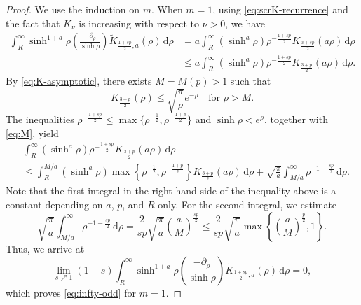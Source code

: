 \documentclass[11pt]{amsart}
\theoremstyle{plain}
\theoremstyle{definition}
\numberwithin{equation}{section}
\begin{document}
\begin{proof}
We use the induction on $m$. When $m=1$, using \eqref{eq:scrK-recurrence} and the fact that $K_{\nu}$ is increasing with respect to $\nu > 0$, we have
\begin{equation*}
\begin{split}
\int_{R}^{\infty} \sinh^{1+a}\rho \left( \frac{-\partial_{\rho}}{\sinh \rho} \right) \widetilde{K}_{\frac{1+sp}{2},a}(\rho)\, \mathrm{d}\rho
&= a \int_{R}^{\infty} (\sinh^{a} \rho) \rho^{-\frac{1+sp}{2}} K_{\frac{3+sp}{2}}(a\rho) \, \mathrm{d}\rho \\
&\leq a \int_{R}^{\infty} (\sinh^{a} \rho) \rho^{-\frac{1+sp}{2}} K_{\frac{3+p}{2}}(a\rho) \, \mathrm{d}\rho.
\end{split}
\end{equation*}
By \eqref{eq:K-asymptotic}, there exists $M = M(p) > 1$ such that
\begin{equation} \label{eq:M}
K_{\frac{3+p}{2}}(\rho) \leq \sqrt{\frac{\pi}{\rho}} e^{-\rho}\quad\text{for } \rho > M.
\end{equation}
The inequalities $\rho^{-\frac{1+sp}{2}} \leq \max\lbrace \rho^{-\frac{1}{2}}, \rho^{-\frac{1+p}{2}} \rbrace$ and $\sinh \rho < e^{\rho}$, together with \eqref{eq:M}, yield
\begin{equation*}
\begin{split}
&\int_{R}^{\infty} (\sinh^{a} \rho) \rho^{-\frac{1+sp}{2}} K_{\frac{3+p}{2}}(a\rho) \, \mathrm{d}\rho \\
&\leq \int_{R}^{M/a} (\sinh^{a} \rho) \max\left\lbrace \rho^{-\frac{1}{2}}, \rho^{-\frac{1+p}{2}} \right\rbrace K_{\frac{3+p}{2}}(a\rho) \, \mathrm{d}\rho + \sqrt{\frac{\pi}{a}} \int_{M/a}^{\infty} \rho^{-1-\frac{sp}{2}} \, \mathrm{d}\rho.
\end{split}
\end{equation*}
Note that the first integral in the right-hand side of the inequality above is a constant depending on $a$, $p$, and $R$ only. For the second integral, we estimate
\begin{equation*}
\sqrt{\frac{\pi}{a}} \int_{M/a}^{\infty} \rho^{-1-\frac{sp}{2}} \, \mathrm{d}\rho = \frac{2}{sp} \sqrt{\frac{\pi}{a}} \left( \frac{a}{M} \right)^{\frac{sp}{2}} \leq \frac{2}{sp} \sqrt{\frac{\pi}{a}} \max \left\lbrace \left( \frac{a}{M} \right)^{\frac{p}{2}}, 1 \right\rbrace.
\end{equation*}
Thus, we arrive at
\begin{equation*}
\lim_{s \nearrow 1} (1-s) \int_{R}^{\infty} \sinh^{1+a}\rho \left( \frac{-\partial_{\rho}}{\sinh \rho} \right) \widetilde{K}_{\frac{1+sp}{2},a}(\rho)\, \mathrm{d}\rho = 0,
\end{equation*}
which proves \eqref{eq:infty-odd} for $m=1$.


\end{proof}
\end{document}
